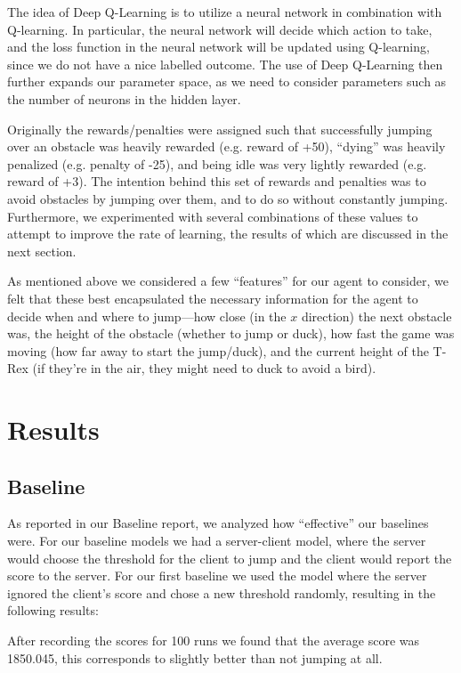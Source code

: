 \documentclass{scrartcl}
\begin{document}
    The idea of Deep Q-Learning is to utilize a neural network in combination
    with Q-learning. In particular, the neural network will decide which action
    to take, and the loss function in the neural network will be updated using
    Q-learning, since we do not have a nice labelled outcome. The use of
    Deep Q-Learning then further expands our parameter space, as we need to
    consider parameters such as the number of neurons in the hidden layer.

    Originally the rewards/penalties were assigned such that successfully
    jumping over an obstacle was heavily rewarded (e.g. reward of +50),
    ``dying'' was heavily penalized (e.g. penalty of -25), and being idle was
    very lightly rewarded (e.g. reward of +3). The intention behind this set of
    rewards and penalties was to avoid obstacles by jumping over them, and to do
    so without constantly jumping. Furthermore, we experimented with several
    combinations of these values to attempt to improve the rate of learning, the
    results of which are discussed in the next section.

    As mentioned above we considered a few ``features'' for our agent to
    consider, we felt that these best encapsulated the necessary information for
    the agent to decide when and where to jump---how close (in the $x$
    direction) the next obstacle was, the height of the obstacle (whether to
    jump or duck), how fast the game was moving (how far away to start the
    jump/duck), and the current height of the T-Rex (if they're in the air,
    they might need to duck to avoid a bird).

\section{Results}

    \subsection{Baseline}
    As reported in our Baseline report, we analyzed how ``effective'' our
    baselines were. For our baseline models we had a server-client model, where
    the server would choose the threshold for the client to jump and the client
    would report the score to the server. For our first baseline we used the
    model where the server ignored the client's score and chose a new threshold
    randomly, resulting in the following results:

    After recording the scores for 100 runs we found that the average score was
    1850.045, this corresponds to slightly better than not jumping at all.
\end{document}
